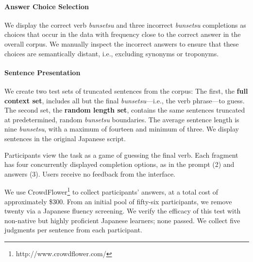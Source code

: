 \paragraph{Answer Choice Selection}

We display the correct verb \textit{bunsetsu} and three incorrect
\textit{bunsetsu} completions as choices that occur in the data with
frequency close to the correct answer in the overall corpus. We
manually inspect the incorrect answers to ensure that these choices
are semantically distant, i.e., excluding synonyms or troponyms.

\paragraph{Sentence Presentation}

We create two test sets of truncated sentences from the 
corpus: The first, the {\bf full context set},
includes all but the final \textit{bunsetsu}---i.e., the verb
phrase---to guess.  The second set, the {\bf random length set},
contains the same sentences truncated at predetermined, random
\textit{bunsetsu} boundaries.  The average sentence length is nine
\textit{bunsetsu}, with a maximum of fourteen and minimum of three. We
display sentences in the original Japanese script.

Participants view the task as a game of guessing the final verb.  Each
fragment has four concurrently displayed completion options, as in
the prompt (2) and answers (3). Users receive no feedback from
the interface.





















We use CrowdFlower\footnote{http://www.crowdflower.com/} to collect
participants' answers, at a total cost of approximately \$300. From
an initial pool of fifty-six participants, we remove twenty via a
Japanese fluency screening. We verify the efficacy of this test with
non-native but highly proficient Japanese learners; none passed. We
collect five judgments per sentence from each participant.


